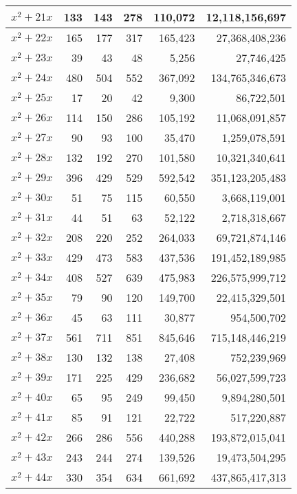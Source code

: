 \documentclass{article}
\begin{document}
\begin{center}
\begin{tabular}{ | c | r | r | r | r | r | }
$x^2 + 21x$ & 133 & 143 & 278 & 110{,}072 & 12{,}118{,}156{,}697 \\ \hline
$x^2 + 22x$ & 165 & 177 & 317 & 165{,}423 & 27{,}368{,}408{,}236 \\ \hline
$x^2 + 23x$ & 39 & 43 & 48 & 5{,}256 & 27{,}746{,}425 \\ \hline
$x^2 + 24x$ & 480 & 504 & 552 & 367{,}092 & 134{,}765{,}346{,}673 \\ \hline
$x^2 + 25x$ & 17 & 20 & 42 & 9{,}300 & 86{,}722{,}501 \\ \hline
$x^2 + 26x$ & 114 & 150 & 286 & 105{,}192 & 11{,}068{,}091{,}857 \\ \hline
$x^2 + 27x$ & 90 & 93 & 100 & 35{,}470 & 1{,}259{,}078{,}591 \\ \hline
$x^2 + 28x$ & 132 & 192 & 270 & 101{,}580 & 10{,}321{,}340{,}641 \\ \hline
$x^2 + 29x$ & 396 & 429 & 529 & 592{,}542 & 351{,}123{,}205{,}483 \\ \hline
$x^2 + 30x$ & 51 & 75 & 115 & 60{,}550 & 3{,}668{,}119{,}001 \\ \hline
$x^2 + 31x$ & 44 & 51 & 63 & 52{,}122 & 2{,}718{,}318{,}667 \\ \hline
$x^2 + 32x$ & 208 & 220 & 252 & 264{,}033 & 69{,}721{,}874{,}146 \\ \hline
$x^2 + 33x$ & 429 & 473 & 583 & 437{,}536 & 191{,}452{,}189{,}985 \\ \hline
$x^2 + 34x$ & 408 & 527 & 639 & 475{,}983 & 226{,}575{,}999{,}712 \\ \hline
$x^2 + 35x$ & 79 & 90 & 120 & 149{,}700 & 22{,}415{,}329{,}501 \\ \hline
$x^2 + 36x$ & 45 & 63 & 111 & 30{,}877 & 954{,}500{,}702 \\ \hline
$x^2 + 37x$ & 561 & 711 & 851 & 845{,}646 & 715{,}148{,}446{,}219 \\ \hline
$x^2 + 38x$ & 130 & 132 & 138 & 27{,}408 & 752{,}239{,}969 \\ \hline
$x^2 + 39x$ & 171 & 225 & 429 & 236{,}682 & 56{,}027{,}599{,}723 \\ \hline
$x^2 + 40x$ & 65 & 95 & 249 & 99{,}450 & 9{,}894{,}280{,}501 \\ \hline
$x^2 + 41x$ & 85 & 91 & 121 & 22{,}722 & 517{,}220{,}887 \\ \hline
$x^2 + 42x$ & 266 & 286 & 556 & 440{,}288 & 193{,}872{,}015{,}041 \\ \hline
$x^2 + 43x$ & 243 & 244 & 274 & 139{,}526 & 19{,}473{,}504{,}295 \\ \hline
$x^2 + 44x$ & 330 & 354 & 634 & 661{,}692 & 437{,}865{,}417{,}313 \\ \hline

\end{tabular}
\end{center}
\end{document}
